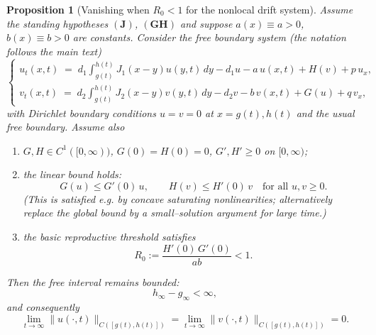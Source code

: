 \documentclass[a4paper,11pt]{amsart}
\newtheorem{proposition}[theorem]{Proposition}
\theoremstyle{definition}
\numberwithin{equation}{section}
\theoremstyle{definition}
\begin{document}
\begin{proposition}[Vanishing when $R_0<1$ for the nonlocal drift system]
Assume the standing hypotheses $(\textbf{J})$, $(\textbf{GH})$ and suppose $a(x)\equiv a>0$, $b(x)\equiv b>0$ are constants.
Consider the free boundary system (the notation follows the main text)
\[
\begin{cases}
u_t(x,t) \;=\; d_1\displaystyle\int_{g(t)}^{h(t)} J_1(x-y)u(y,t)\,dy - d_1 u - a\,u(x,t)
        + H(v) + p\,u_x,\\[6pt]
v_t(x,t) \;=\; d_2\displaystyle\int_{g(t)}^{h(t)} J_2(x-y)v(y,t)\,dy - d_2 v - b\,v(x,t) + G(u) + q\,v_x,
\end{cases}
\]
with Dirichlet boundary conditions \(u=v=0\) at \(x=g(t),h(t)\) and the usual free boundary. Assume also
\begin{enumerate}
  \item $G,H\in C^1([0,\infty))$, $G(0)=H(0)=0$, $G',H'\geq0$ on $[0,\infty)$;
  \item the linear bound holds:
  \[
  G(u)\leq G'(0)\,u,\qquad H(v)\leq H'(0)\,v\quad\text{for all }u,v\geq0.
  \]
  (This is satisfied e.g. by concave saturating nonlinearities; alternatively replace the global bound by a small–solution argument for large time.)
  \item the basic reproductive threshold satisfies
  \[
  R_0:=\frac{H'(0)\,G'(0)}{ab}<1.
  \]
\end{enumerate}
Then the free interval remains bounded:
\[
h_\infty-g_\infty<\infty,
\]
and consequently
\[
\lim_{t\to\infty}\|u(\cdot,t)\|_{C([g(t),h(t)])}
=\lim_{t\to\infty}\|v(\cdot,t)\|_{C([g(t),h(t)])}=0.
\]
\end{proposition}
\end{document}
